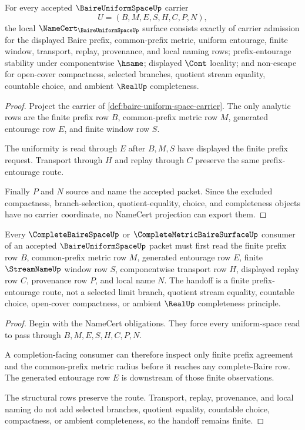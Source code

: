 \begin{theorem}
\label{thm:baire-uniform-space-namecert-obligations}
For every accepted $\BaireUniformSpaceUp$ carrier
$$
U=(B,M,E,S,H,C,P,N),
$$
the local $\NameCert_{\BaireUniformSpaceUp}$ surface consists exactly of carrier admission for the displayed Baire prefix, common-prefix metric, uniform entourage, finite window, transport, replay, provenance, and local naming rows; prefix-entourage stability under componentwise $\hsame$; displayed $\Cont$ locality; and non-escape for open-cover compactness, selected branches, quotient stream equality, countable choice, and ambient $\RealUp$ completeness.
\end{theorem}
\begin{proof}
Project the carrier of \autoref{def:baire-uniform-space-carrier}. The only analytic rows are the finite prefix row $B$, common-prefix metric row $M$, generated entourage row $E$, and finite window row $S$.

The uniformity is read through $E$ after $B,M,S$ have displayed the finite prefix request. Transport through $H$ and replay through $C$ preserve the same prefix-entourage route.

Finally $P$ and $N$ source and name the accepted packet. Since the excluded compactness, branch-selection, quotient-equality, choice, and completeness objects have no carrier coordinate, no NameCert projection can export them.
\end{proof}

\begin{theorem}
\label{thm:baire-uniform-space-complete-metric-handoff}
Every $\CompleteBaireSpaceUp$ or $\CompleteMetricBaireSurfaceUp$ consumer of an accepted $\BaireUniformSpaceUp$ packet must first read the finite prefix row $B$, common-prefix metric row $M$, generated entourage row $E$, finite $\StreamNameUp$ window row $S$, componentwise transport row $H$, displayed replay row $C$, provenance row $P$, and local name $N$. The handoff is a finite prefix-entourage route, not a selected limit branch, quotient stream equality, countable choice, open-cover compactness, or ambient $\RealUp$ completeness principle.
\end{theorem}
\begin{proof}
Begin with the NameCert obligations. They force every uniform-space read to pass through $B,M,E,S,H,C,P,N$.

A completion-facing consumer can therefore inspect only finite prefix agreement and the common-prefix metric radius before it reaches any complete-Baire row. The generated entourage row $E$ is downstream of those finite observations.

The structural rows preserve the route. Transport, replay, provenance, and local naming do not add selected branches, quotient equality, countable choice, compactness, or ambient completeness, so the handoff remains finite.
\end{proof}

